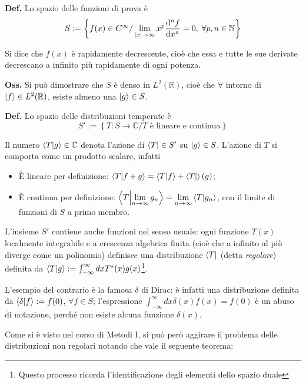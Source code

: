 \textbf{Def.} Lo spazio delle funzioni di prova è
$$ S := \left\{ f(x) \in C^{\infty} / \lim\limits_{|x|\to\infty}
x^p \dv[n]{f}{x}=0,\; \forall p,n\in\mathbb{N}\right\} $$

Si dice che $ f(x) $ è rapidamente decrescente, cioè che essa e tutte le sue derivate
decrescano a infinito più rapidamente di ogni potenza.

\textbf{Oss.} Si può dimostrare che $ S $ è denso in $L^2(\mathbb{R})$, cioè che
$ \forall$ intorno di $\ket{f}\in L^2(\mathbb{R})$, esiste almeno una $\ket{g}\in S$. 

\textbf{Def.} Lo spazio delle distribuzioni temperate è
$$ S':=\left\{ T:S\to\mathbb{C}/T\text{ è lineare e continua} \right\} $$

Il numero $ \bra{T}\ket{g}\in\mathbb{C} $ denota l'azione di $ \bra{T}\in S' $ su $ \ket{g}\in S $.
\newpage
L'azione di $ T $ si comporta come un prodotto scalare, infatti
\begin{itemize}
    \item È lineare per definizione: $\bra{T}\ket{f+g}=\bra{T}\ket{f} + \bra{T}\ket(g)$;
    \item È continua per definizione: 
	$ \bra{T}\ket{\lim\limits_{n\to\infty}g_n} =\lim\limits_{n\to\infty}
	\bra{T}\ket{g_n} $, con il limite di funzioni di $ S $ a primo membro. 
\end{itemize}


L'insieme $ S' $ contiene anche funzioni nel senso usuale: ogni funzione $ T(x) $ 
localmente integrabile e a crescenza algebrica finita (cioè che a infinito al più
diverge come un polinomio) definisce una distribuzione $ \bra{T} $ (detta
\textit{regolare}) definita da $\bra{T}\ket{g} := \int_{-\infty}^{\infty}dxT^*(x)g(x) $\footnote
{Questo processo ricorda l'identificazione degli elementi dello spazio duale}.

L'esempio del contrario è la famosa $ \delta $ di Dirac: è infatti una distribuzione
definita da $ \bra{\delta}\ket{f}:=f(0)$, $ \forall f\in S $; l'espressione
$ \int_{-\infty}^{\infty}dx\delta(x) f(x) = f(0) $ è un abuso di notazione, perché non 
esiste alcuna funzione $ \delta(x) $.

Come si è visto nel corso di Metodi I, si può però aggirare il problema delle
distribuzioni non regolari notando che vale il seguente teorema:

\noindent{}

